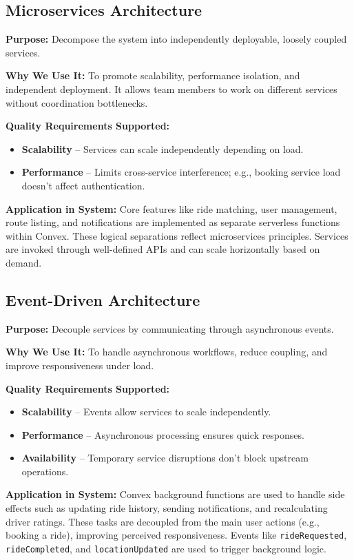 \documentclass[12pt]{article}
\begin{document}
\subsection{Microservices Architecture}

\textbf{Purpose:} Decompose the system into independently deployable, loosely coupled services.

\textbf{Why We Use It:} To promote scalability, performance isolation, and independent deployment. It allows team members to work on different services without coordination bottlenecks.

\textbf{Quality Requirements Supported:}  
\begin{itemize}
  \item \textbf{Scalability} – Services can scale independently depending on load.
  \item \textbf{Performance} – Limits cross-service interference; e.g., booking service load doesn’t affect authentication.
\end{itemize}

\textbf{Application in System:}  
Core features like ride matching, user management, route listing, and notifications are implemented as separate serverless functions within Convex. These logical separations reflect microservices principles. Services are invoked through well-defined APIs and can scale horizontally based on demand.

\subsection{Event-Driven Architecture}

\textbf{Purpose:} Decouple services by communicating through asynchronous events.

\textbf{Why We Use It:} To handle asynchronous workflows, reduce coupling, and improve responsiveness under load.

\textbf{Quality Requirements Supported:}
\begin{itemize}
  \item \textbf{Scalability} – Events allow services to scale independently.
  \item \textbf{Performance} – Asynchronous processing ensures quick responses.
  \item \textbf{Availability} – Temporary service disruptions don't block upstream operations.
\end{itemize}

\textbf{Application in System:}  
Convex background functions are used to handle side effects such as updating ride history, sending notifications, and recalculating driver ratings. These tasks are decoupled from the main user actions (e.g., booking a ride), improving perceived responsiveness. Events like \texttt{rideRequested}, \texttt{rideCompleted}, and \texttt{locationUpdated} are used to trigger background logic.
\end{document}
